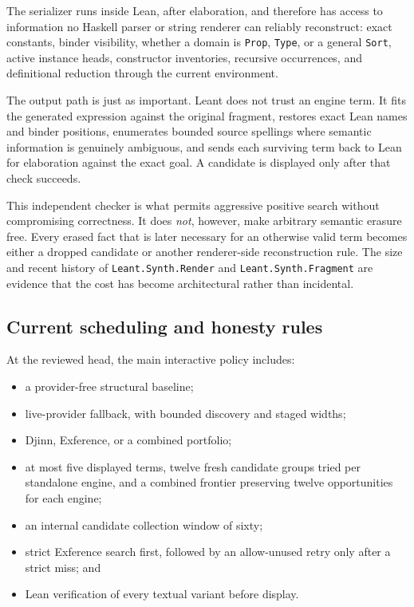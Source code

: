 \documentclass[11pt]{article}
\newcommand{\code}[1]{\texttt{#1}}
\newcommand{\Leant}{\textsf{Leant}}
\newcommand{\Djinn}{Djinn}
\newcommand{\Exference}{Exference}
\begin{document}
The serializer runs inside Lean, after elaboration, and therefore has access to
information no Haskell parser or string renderer can reliably reconstruct:
exact constants, binder visibility, whether a domain is \code{Prop},
\code{Type}, or a general \code{Sort}, active instance heads, constructor
inventories, recursive occurrences, and definitional reduction through the
current environment.

The output path is just as important.  \Leant{} does not trust an engine term.
It fits the generated expression against the original fragment, restores exact
Lean names and binder positions, enumerates bounded source spellings where
semantic information is genuinely ambiguous, and sends each surviving term
back to Lean for elaboration against the exact goal.  A candidate is displayed
only after that check succeeds.

This independent checker is what permits aggressive positive search without
compromising correctness.  It does \emph{not}, however, make arbitrary
semantic erasure free.  Every erased fact that is later necessary for an
otherwise valid term becomes either a dropped candidate or another
renderer-side reconstruction rule.  The size and recent history of
\code{Leant.Synth.Render} and \code{Leant.Synth.Fragment} are evidence that the
cost has become architectural rather than incidental.

\subsection{Current scheduling and honesty rules}

At the reviewed head, the main interactive policy includes:

\begin{itemize}
  \item a provider-free structural baseline;
  \item live-provider fallback, with bounded discovery and staged widths;
  \item \Djinn{}, \Exference{}, or a combined portfolio;
  \item at most five displayed terms, twelve fresh candidate groups tried per
    standalone engine, and a combined frontier preserving twelve opportunities
    for each engine;
  \item an internal candidate collection window of sixty;
  \item strict \Exference{} search first, followed by an allow-unused retry only
    after a strict miss; and
  \item Lean verification of every textual variant before display.
\end{itemize}
\end{document}
